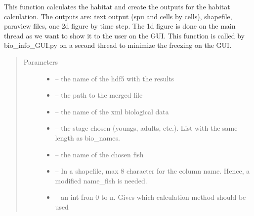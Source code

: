 \documentclass[letterpaper,10pt,english]{sphinxmanual}
\begin{document}

\begin{fulllineitems}
\label{\detokenize{index:src.calcul_hab.calc_hab_and_output}}
This function calculates the habitat and create the outputs for the habitat calculation. The outputs are: text
output (spu and cells by cells), shapefile, paraview files, one 2d figure by time step. The 1d figure
is done on the main thread as we want to show it to the user on the GUI. This function is called by bio\_info\_GUI.py
on a second thread to minimize the freezing on the GUI.
\begin{quote}\begin{description}
\item[{Parameters}] \leavevmode\begin{itemize}
\item {} 
 -- the name of the hdf5 with the results

\item {} 
 -- the path to the merged file

\item {} 
 -- the name of the xml biological data

\item {} 
 -- the stage chosen (youngs, adults, etc.). List with the same length as bio\_names.

\item {} 
 -- the name of the chosen fish

\item {} 
 -- In a shapefile, max 8 character for the column name. Hence, a modified name\_fish is needed.

\item {} 
 -- an int fron 0 to n. Gives which calculation method should be used


\end{itemize}
\end{description}
\end{quote}
\end{fulllineitems}
\end{document}
